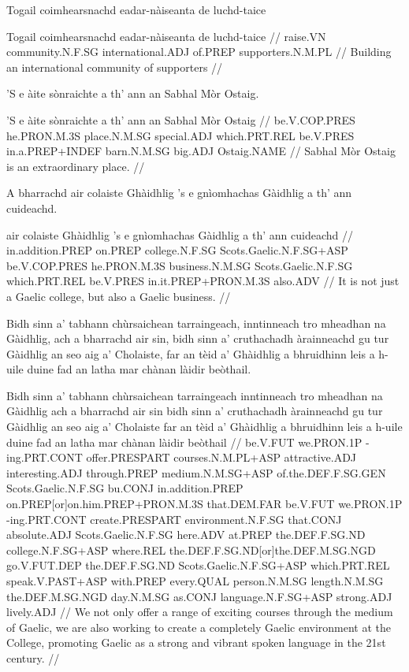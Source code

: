 \documentclass[a4paper,10pt]{article}
\begin{document}
\ex
\begingl
\glpre Togail coimhearsnachd eadar-nàiseanta de luchd-taice 

\vspace{4mm}
\gla Togail coimhearsnachd eadar-nàiseanta de luchd-taice  //
\glb raise.VN community.N.F.SG international.ADJ of.PREP supporters.N.M.PL  //
\glft Building an international community of supporters //
\endgl
\xe

\ex
\begingl
\glpre 'S e àite sònraichte a th' ann an Sabhal Mòr Ostaig. 

\vspace{4mm}
\gla 'S e àite sònraichte a th' {ann an} Sabhal Mòr Ostaig  //
\glb be.V.COP.PRES he.PRON.M.3S place.N.M.SG special.ADJ which.PRT.REL be.V.PRES in.a.PREP+INDEF barn.N.M.SG big.ADJ Ostaig.NAME  //
\glft Sabhal Mòr Ostaig is an extraordinary place. //
\endgl
\xe

\ex
\begingl
\glpre A bharrachd air colaiste Ghàidhlig 's e gnìomhachas Gàidhlig a th' ann cuideachd. 

\vspace{4mm}
 air colaiste Ghàidhlig 's e gnìomhachas Gàidhlig a th' ann cuideachd  //
\glb in.addition.PREP on.PREP college.N.F.SG Scots.Gaelic.N.F.SG+ASP be.V.COP.PRES he.PRON.M.3S business.N.M.SG Scots.Gaelic.N.F.SG which.PRT.REL be.V.PRES in.it.PREP+PRON.M.3S also.ADV  //
\glft It is not just a Gaelic college, but also a Gaelic business. //
\endgl
\xe

\ex
\begingl
\glpre Bidh sinn a' tabhann chùrsaichean tarraingeach, inntinneach tro mheadhan na Gàidhlig, ach a bharrachd air sin, bidh sinn a' cruthachadh àrainneachd gu tur Gàidhlig an seo aig a' Cholaiste, far an tèid a' Ghàidhlig a bhruidhinn leis a h-uile duine fad an latha mar chànan làidir beòthail. 

\vspace{4mm}
\gla Bidh sinn a' tabhann chùrsaichean tarraingeach inntinneach tro mheadhan na Gàidhlig ach {a bharrachd} air sin bidh sinn a' cruthachadh àrainneachd gu tur Gàidhlig {an seo} aig a' Cholaiste far an tèid a' Ghàidhlig a bhruidhinn leis {a h-uile} duine fad an latha mar chànan làidir beòthail  //
\glb be.V.FUT we.PRON.1P -ing.PRT.CONT offer.PRESPART courses.N.M.PL+ASP attractive.ADJ interesting.ADJ through.PREP medium.N.M.SG+ASP of.the.DEF.F.SG.GEN Scots.Gaelic.N.F.SG bu.CONJ in.addition.PREP on.PREP[or]on.him.PREP+PRON.M.3S that.DEM.FAR be.V.FUT we.PRON.1P -ing.PRT.CONT create.PRESPART environment.N.F.SG that.CONJ absolute.ADJ Scots.Gaelic.N.F.SG here.ADV at.PREP the.DEF.F.SG.ND college.N.F.SG+ASP where.REL the.DEF.F.SG.ND[or]the.DEF.M.SG.NGD go.V.FUT.DEP the.DEF.F.SG.ND Scots.Gaelic.N.F.SG+ASP which.PRT.REL speak.V.PAST+ASP with.PREP every.QUAL person.N.M.SG length.N.M.SG the.DEF.M.SG.NGD day.N.M.SG as.CONJ language.N.F.SG+ASP strong.ADJ lively.ADJ  //
\glft We not only offer a range of exciting courses through the medium of Gaelic, we are also working to create a completely Gaelic environment at the College, promoting Gaelic as a strong and vibrant spoken language in the 21st century. //
\endgl
\xe
\end{document}
